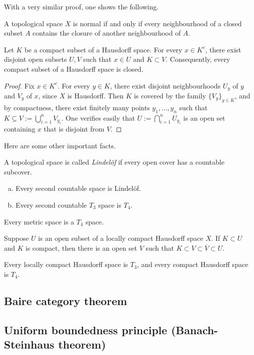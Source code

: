 With a very similar proof, one shows the following.
\begin{proposition}
	A topological space $X$ is normal if and only if every neighbourhood of a closed subset $A$ contains the closure of another neighbourhood of $A$.
\end{proposition}

\begin{proposition}
	Let $K$ be a compact subset of a Hausdorff space. For every $x \in K^c$, there exist disjoint open subsets $U, V$ such that $x \in U$ and $K \subset V$. Consequently, every compact subset of a Hausdorff space is closed.
\end{proposition}

\begin{proof}
	Fix $x \in K^c$. For every $y \in K$, there exist disjoint neighbourhoods $U_y$ of $y$ and $V_y$ of $x$, since $X$ is Hausdorff. Then $K$ is covered by the family $\{V_y\}_{y \in K}$, and by compactness, there exist finitely many points $y_1, \ldots, y_n$ such that $K \subseteq V := \bigcup_{i=1}^n V_{y_i}$. One verifies easily that $U := \bigcap_{i=1}^n U_{y_i}$ is an open set containing $x$ that is disjoint from $V$.
\end{proof}

Here are some other important facts.
\begin{proposition}
	A topological space is called \emph{Lindel\"{o}f} if every open cover has a countable subcover.
	\begin{enumerate}[(a)]
		\item Every second countable space is Lindel\"{o}f.
		\item Every second countable $T_3$ space is $T_4$.
	\end{enumerate}
\end{proposition}

\begin{proposition}
	Every metric space is a $T_4$ space.
\end{proposition}

\begin{theorem}
	Suppose $U$ is an open subset of a locally compact Hausdorff space $X$. If $K \subset U$ and $K$ is compact, then there is an open set $V$ such that $K \subset V \subset \overline{V} \subset U$.
\end{theorem}

\begin{corollary}
	Every locally compact Hausdorff space is $T_3$, and every compact Hausdorff space is $T_4$.
\end{corollary}

\subsection{Baire category theorem}

\subsection{Uniform boundedness principle (Banach-Steinhaus theorem)}